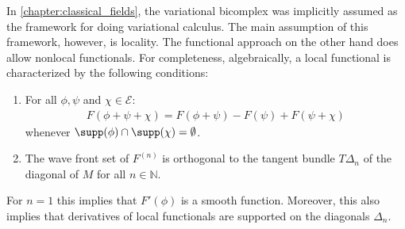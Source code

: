     \begin{remark}
        In \cref{chapter:classical_fields}, the variational bicomplex was implicitly assumed as the framework for doing variational calculus. The main assumption of this framework, however, is locality. The functional approach on the other hand does allow nonlocal functionals. For completeness, algebraically, a local functional is characterized by the following conditions:
        \begin{enumerate}
            \item For all $\phi,\psi$ and $\chi\in\mathcal{E}$:
                \begin{gather}
                    F(\phi+\psi+\chi)=F(\phi+\psi)-F(\psi)+F(\psi+\chi)
                \end{gather}
                whenever $\supp(\phi)\cap\supp(\chi)=\emptyset$.
            \item The wave front set of $F^{(n)}$ is orthogonal to the tangent bundle $T\Delta_n$ of the diagonal of $M$ for all $n\in\mathbb{N}$.
        \end{enumerate}
        For $n=1$ this implies that $F'(\phi)$ is a smooth function. Moreover, this also implies that derivatives of local functionals are supported on the diagonals $\Delta_n$.
    \end{remark}


